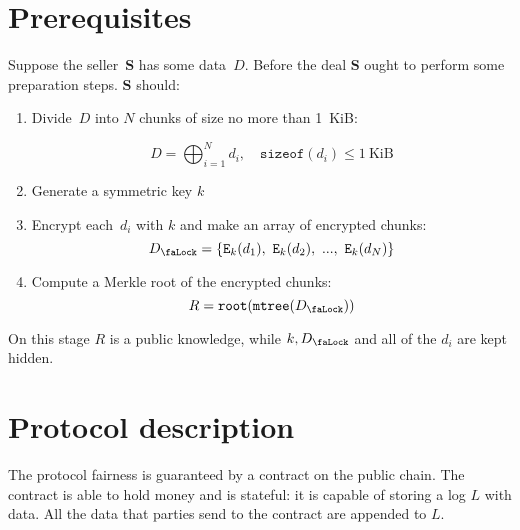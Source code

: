 \documentclass[a4paper]{article}
\newcommand{\Lock}{{D_\text{\faLock}}}
\newcommand{\Encrypt}{\mathtt{E}}
\newcommand{\MerkleTree}{\mathtt{mtree}}
\newcommand{\Root}{\mathtt{root}}
\newcommand{\Party}[1]{\mathbf{#1}}
\newcommand{\Key}[1]{#1}
\newcommand{\Concat}{\bigoplus}
\newcommand{\SizeOf}{\mathtt{sizeof}}
\begin{document}
\section{Prerequisites}
Suppose the seller~$\Party{S}$ has some data~$D$. Before the deal $\Party{S}$ ought to perform some preparation steps. $\Party{S}$ should:
\begin{enumerate}
\item Divide~$D$ into $N$ chunks of size no more than 1~KiB:

\begin{equation}
D = \Concat_{i=1}^N d_i, \quad \SizeOf(d_i) \leq 1~\mathrm{KiB}
\end{equation}

\item Generate a symmetric key $k$
\item Encrypt each~$d_i$ with $k$ and make an array of encrypted chunks:
\begin{equation}
\Lock = \{ \Encrypt_\Key{k}(d_1),\ \Encrypt_\Key{k}(d_2),\ ...,\ \Encrypt_\Key{k}(d_N) \}
\end{equation}

\item Compute a Merkle root of the encrypted chunks:
\begin{equation}
R = \Root(\MerkleTree(\Lock))
\end{equation}

\end{enumerate}

On this stage $R$ is a public knowledge, while $k, \Lock$ and all of the $d_i$ are kept hidden.

\section{Protocol description}
The protocol fairness is guaranteed by a contract on the public chain. The contract is able to hold money and is stateful: it is capable of storing a log $L$ with data. All the data that parties send to the contract are appended to $L$.
\end{document}
